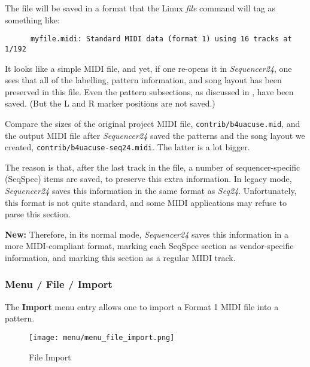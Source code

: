    The file will be saved in a format that the Linux \textsl{file} command
   will tag as something like:

   \begin{verbatim}
      myfile.midi: Standard MIDI data (format 1) using 16 tracks at 1/192
   \end{verbatim}

   It looks like a simple MIDI file, and yet, if one re-opens it in
   \textsl{Sequencer24}, one sees that all of the labelling, pattern information,
   and song layout has been preserved in this file.
   Even the pattern subsections, as discussed in
   ,
   have been saved.
   (But the L and R marker positions are not saved.)

   Compare the sizes of the original project MIDI file,
   \texttt{contrib/b4uacuse.mid}, and the output MIDI file after
   \textsl{Sequencer24} saved the patterns and the song layout we created,
   \texttt{contrib/b4uacuse-seq24.midi}.  The latter is a lot
   bigger.

   The reason is that, after the last track in the file, a number of
   sequencer-specific (SeqSpec) items are saved, to preserve this extra
   information.  In legacy mode, \textsl{Sequencer24} saves this information
   in the same format as \textsl{Seq24}.  Unfortunately, this format is
   not quite standard, and some MIDI applications may refuse to parse this
   section. 
   
   \textbf{New:}
   Therefore, in its normal mode, \textsl{Sequencer24} saves this
   information in a more MIDI-compliant format, marking each SeqSpec section
   as vendor-specific information, and marking this section as a regular
   MIDI track.

\subsubsection{Menu / File / Import}
\label{subsubsec:seq24_menu_file_import}

   The \textbf{Import} menu entry allows one to import a Format 1 MIDI file
   into a pattern.

\begin{figure}[H]
   \centering 
   \texttt{[image: menu/menu\_file\_import.png]}
   \caption{File Import}
   \label{fig:seq24_menu_file_import}
\end{figure}

